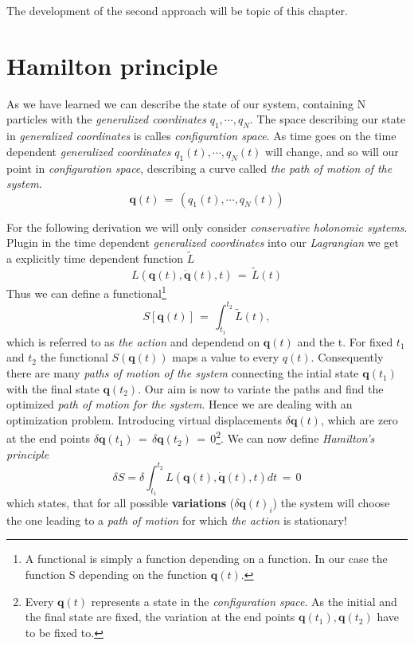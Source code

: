 \documentclass{report}
\renewcommand{\vec}[1]{\mathbf{#1}}
\begin{document}
The development of the second approach will be topic of this chapter.

\section{Hamilton principle}
As we have learned we can describe the state of our system, containing N
particles with the \textit{generalized coordinates} $q_1, \cdots, q_N$. The
space describing our state in \textit{generalized coordinates} is calles
\textit{configuration space}. As time goes on the time dependent
\textit{generalized coordinates} $q_1(t), \cdots, q_N(t)$ will change, and so
will our point in \textit{configuration space}, describing a curve called
\textit{the path of motion of the system}.
\begin{equation}
  \vec q(t) \,=\, (q_1(t), \cdots, q_N(t))
\end{equation}

For the following derivation we will only consider \textit{conservative holonomic
systems}. Plugin in the time dependent \textit{generalized coordinates} into
our \textit{Lagrangian} we get a explicitly time dependent function $\tilde L$
\begin{equation}
  L(\vec q(t), \dot{\vec q}(t), t) \,=\, \tilde L(t) 
\end{equation}
Thus we can define a functional\footnote{A functional is simply a function
depending on a function. In our case the function S depending on the function
$\vec q(t)$.}
\begin{equation}
  S[\vec q(t)] \,=\, \int_{t_1}^{t_2} \tilde L(t),
\end{equation}
which is referred to as \textit{the action} and dependend on $\vec q(t)$ and the t.
For fixed $t_1$ and $t_2$ the functional $S(\vec q(t))$ maps a value to every
$q(t)$. Consequently there are many \textit{paths of motion of the system}
connecting the intial state $\vec q(t_1)$ with the final state $\vec q(t_2)$.
Our aim is now to variate the paths and find the optimized
\textit{path of motion for the system}. Hence we are dealing with an optimization 
problem. Introducing virtual displacements $\delta \vec q(t)$, which are zero at the 
end points $\delta \vec q(t_1) \,=\, \delta \vec q(t_2) \,=\, 0$\footnote{Every $\vec
q(t)$ represents a state in the \textit{configuration space}. As the initial
and the final state are fixed, the variation at the end points $\vec q(t_1),
\vec q(t_2)$ have to be fixed to.}. We can now define \textit{Hamilton's
principle} 
\begin{equation}
  \delta S = \delta \int_{t_1}^{t_2} L(\vec q(t), \dot{\vec q}(t), t) dt \,=\, 0
\end{equation}
which states, that for all possible \textbf{variations} ($\delta \vec q(t)_i$) the system will choose the
one leading to a \textit{path of motion} for which \textit{the action} is
stationary!
\end{document}
